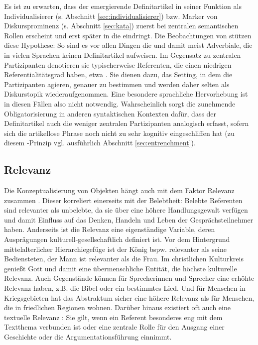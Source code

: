 Es ist zu erwarten, dass der emergierende Definitartikel in seiner Funktion als Individualisierer (s. Abschnitt \ref{sec:individualisierer}) bzw. Marker von Diskursprominenz (s. Abschnitt \ref{sec:kata}) zuerst bei zentralen semantischen Rollen erscheint und erst später in die  eindringt. Die Beobachtungen von \textcite{Himmelmann1998} stützen diese Hypothese: So sind es vor allen Dingen die  \parencite[116]{Himmelmann1998} und damit meist Adverbiale, die in vielen Sprachen keinen Definitartikel aufweisen. Im Gegensatz zu zentralen Partizipanten denotieren sie typischerweise Referenten, die einen niedrigen Referentialitätsgrad haben, etwa .  Sie dienen dazu, das Setting, in dem die Partizipanten agieren, genauer zu bestimmen \parencite["-="- orientierende Funktion, s.][118]{Himmelmann1997} und werden daher selten als Diskurstopik wiederaufgenommen. Eine besondere sprachliche Hervorhebung ist in diesen Fällen also nicht notwendig. Wahrscheinlich sorgt die zunehmende Obligatorisierung in anderen syntaktischen Kontexten dafür, dass der Definitartikel auch die weniger zentralen Partizipanten analogisch erfasst, sofern sich die artikellose Phrase noch nicht zu sehr kognitiv eingeschliffen hat (zu diesem -Prinzip vgl. ausführlich Abschnitt \ref{sec:entrenchment}). 

\subsection{Relevanz}\label{sec:relevanz}

Die Konzeptualisierung von Objekten hängt auch mit dem Faktor Relevanz zusammen \parencite[s.][347]{Szczepaniak2011}.  
Dieser korreliert einerseits mit der Belebtheit: Belebte Referenten sind relevanter als unbelebte, da sie  über eine höhere Handlungsgewalt verfügen und damit Einfluss auf das Denken, Handeln und Leben der Gesprächsteilnehmer haben. Anderseits ist die Relevanz eine eigenständige Variable, deren Ausprägungen kulturell-gesellschaftlich definiert ist. Vor dem Hintergrund mittelalterlicher Hierarchiegefüge ist der König bspw. relevanter als seine Bediensteten, der Mann ist relevanter als die Frau. Im christlichen Kulturkreis genießt Gott und damit eine übermenschliche Entität, die höchste kulturelle Relevanz. Auch Gegenstände können für Sprecherinnen und Sprecher eine erhöhte Relevanz haben, z.B. die Bibel oder ein bestimmtes Lied. Und für Menschen in Kriegsgebieten hat das Abstraktum  sicher eine höhere Relevanz als für Menschen, die in friedlichen Regionen wohnen.  Darüber hinaus existiert oft auch eine textuelle Relevanz  \parencite[347]{Szczepaniak2011}: Sie gilt, wenn ein Referent besonderes eng mit dem Textthema verbunden ist oder eine zentrale Rolle für den Ausgang einer Geschichte oder die Argumentationsführung einnimmt.

